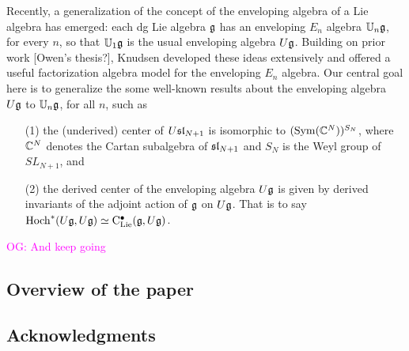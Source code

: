 \documentclass[11pt]{amsart}
\numberwithin{equation}{section}
\def\owen{\textcolor{magenta}{OG: }\textcolor{magenta}}
\begin{document}
Recently, a generalization of the concept of the enveloping algebra of a Lie algebra has emerged: 
each dg Lie algebra $\fg$ has an enveloping $E_n$ algebra $\UU_n\fg$, for every $n$, 
so that $\UU_1\fg$ is the usual enveloping algebra $U\fg$. 
Building on prior work \cite{BD, AF} [Owen's thesis?], 
Knudsen \cite{Knudsen} developed these ideas extensively and offered a useful factorization algebra model for the enveloping $E_n$ algebra. 
Our central goal here is to generalize the some well-known results about the enveloping algebra $U\fg$ to $\UU_n\fg$, for all $n$, such as
\begin{enumerate}
\item[(1)] the (underived) center of $U\sl_{N+1}$ is isomorphic to $(\Sym(\CC^{N}))^{S_N}$, where $\CC^{N}$ denotes the Cartan subalgebra of $\sl_{N+1}$ and $S_N$ is the Weyl group of $SL_{N+1}$, and
\item[(2)] the derived center of the enveloping algebra $U\fg$ is given by derived invariants of the adjoint action of $\fg$ on $U\fg$. That is to say $\Hoch^*(U\fg,U\fg) \simeq \clies(\fg, U\fg)$.
\end{enumerate}
\owen{And keep going}
%
%
%

\subsection{Overview of the paper}

\subsection{Acknowledgments}
\end{document}
